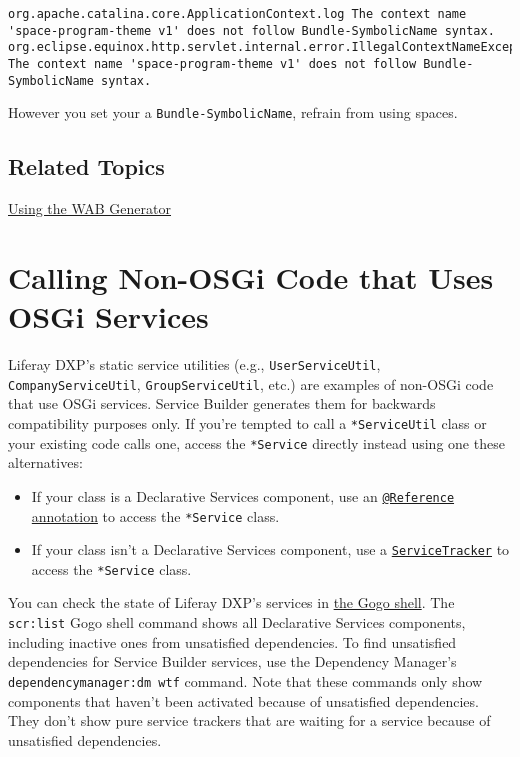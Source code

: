 \begin{verbatim}
org.apache.catalina.core.ApplicationContext.log The context name 'space-program-theme v1' does not follow Bundle-SymbolicName syntax.
org.eclipse.equinox.http.servlet.internal.error.IllegalContextNameException: The context name 'space-program-theme v1' does not follow Bundle-SymbolicName syntax.
\end{verbatim}

However you set your a \texttt{Bundle-SymbolicName}, refrain from using
spaces.

\section{Related Topics}\label{related-topics-29}

\href{/docs/7-2/customization/-/knowledge_base/c/deploying-wars-wab-generator}{Using
the WAB Generator}

\chapter{Calling Non-OSGi Code that Uses OSGi
Services}\label{calling-non-osgi-code-that-uses-osgi-services}

Liferay DXP's static service utilities (e.g., \texttt{UserServiceUtil},
\texttt{CompanyServiceUtil}, \texttt{GroupServiceUtil}, etc.) are
examples of non-OSGi code that use OSGi services. Service Builder
generates them for backwards compatibility purposes only. If you're
tempted to call a \texttt{*ServiceUtil} class or your existing code
calls one, access the \texttt{*Service} directly instead using one these
alternatives:

\begin{itemize}
\item
  If your class is a Declarative Services component, use an
  \href{/docs/7-2/frameworks/-/knowledge_base/f/declarative-services}{\texttt{@Reference}
  annotation} to access the \texttt{*Service} class.
\item
  If your class isn't a Declarative Services component, use a
  \href{/docs/7-2/frameworks/-/knowledge_base/f/service-trackers-for-osgi-services}{\texttt{ServiceTracker}}
  to access the \texttt{*Service} class.
\end{itemize}

You can check the state of Liferay DXP's services in
\href{/docs/7-2/customization/-/knowledge_base/c/using-the-felix-gogo-shell}{the
Gogo shell}. The \texttt{scr:list} Gogo shell command shows all
Declarative Services components, including inactive ones from
unsatisfied dependencies. To find unsatisfied dependencies for Service
Builder services, use the Dependency Manager's
\texttt{dependencymanager:dm\ wtf} command. Note that these commands
only show components that haven't been activated because of unsatisfied
dependencies. They don't show pure service trackers that are waiting for
a service because of unsatisfied dependencies.

